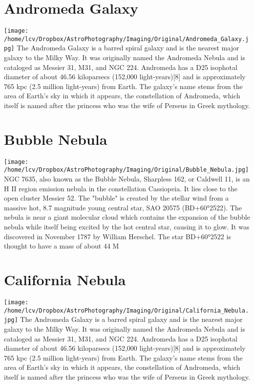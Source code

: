 \newpage\pagecolor{black}\color{white}
\section{Andromeda Galaxy}
\texttt{[image: /home/lcv/Dropbox/AstroPhotography/Imaging/Original/Andromeda\_Galaxy.jpg]}
{\footnotesize\color{white}
The Andromeda Galaxy is a barred spiral galaxy and is the nearest major galaxy to the Milky Way. It was originally named the Andromeda Nebula and is cataloged as Messier 31, M31, and NGC 224. Andromeda has a D25 isophotal diameter of about 46.56 kiloparsecs (152,000 light-years)[8] and is approximately 765 kpc (2.5 million light-years) from Earth. The galaxy's name stems from the area of Earth's sky in which it appears, the constellation of Andromeda, which itself is named after the princess who was the wife of Perseus in Greek mythology. 
}
\section{Bubble Nebula}
\texttt{[image: /home/lcv/Dropbox/AstroPhotography/Imaging/Original/Bubble\_Nebula.jpg]}
{\footnotesize\color{white}
NGC 7635, also known as the Bubble Nebula, Sharpless 162, or Caldwell 11, is an H II region emission nebula in the constellation Cassiopeia. It lies close to the open cluster Messier 52. The "bubble" is created by the stellar wind from a massive hot, 8.7 magnitude young central star, SAO 20575 (BD+60°2522). The nebula is near a giant molecular cloud which contains the expansion of the bubble nebula while itself being excited by the hot central star, causing it to glow. It was discovered in November 1787 by William Herschel. The star BD+60°2522 is thought to have a mass of about 44 M 
}
\section{California Nebula}
\texttt{[image: /home/lcv/Dropbox/AstroPhotography/Imaging/Original/California\_Nebula.jpg]}
{\footnotesize\color{white}
The Andromeda Galaxy is a barred spiral galaxy and is the nearest major galaxy to the Milky Way. It was originally named the Andromeda Nebula and is cataloged as Messier 31, M31, and NGC 224. Andromeda has a D25 isophotal diameter of about 46.56 kiloparsecs (152,000 light-years)[8] and is approximately 765 kpc (2.5 million light-years) from Earth. The galaxy's name stems from the area of Earth's sky in which it appears, the constellation of Andromeda, which itself is named after the princess who was the wife of Perseus in Greek mythology. 
}
